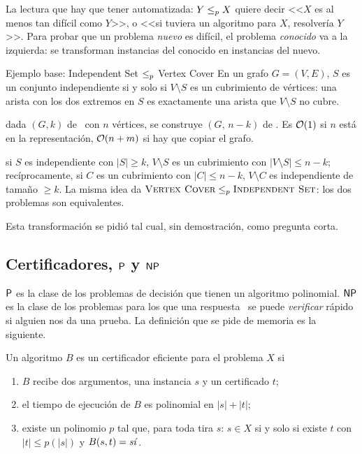 La lectura que hay que tener automatizada: $Y\redp X$ quiere decir <<$X$ es al menos tan difícil como $Y$>>, o <<si tuviera un algoritmo para $X$, resolvería $Y$>>. Para probar que un problema \emph{nuevo} es difícil, el problema \emph{conocido} va a la izquierda: se transforman instancias del conocido en instancias del nuevo.

\begin{problema}{Ejemplo base: Independent Set $\redp$ Vertex Cover}
En un grafo $G=(V,E)$, $S$ es un conjunto independiente si y solo si $V\setminus S$ es un cubrimiento de vértices: una arista con los dos extremos en $S$ es exactamente una arista que $V\setminus S$ no cubre.

 dada $(G,k)$ de \npIS\ con $n$ vértices, se construye $(G,\,n-k)$ de \npVC. Es $\Oh(1)$ si $n$ está en la representación, $\Oh(n+m)$ si hay que copiar el grafo.

 si $S$ es independiente con $|S|\ge k$, $V\setminus S$ es un cubrimiento con $|V\setminus S|\le n-k$; recíprocamente, si $C$ es un cubrimiento con $|C|\le n-k$, $V\setminus C$ es independiente de tamaño $\ge k$. La misma idea da $\npVC\redp\npIS$: los dos problemas son equivalentes.
\end{problema}

Esta transformación se pidió tal cual, sin demostración, como pregunta corta.

\subsection{Certificadores, \texorpdfstring{$\Pclass$}{P} y \texorpdfstring{$\NP$}{NP}}

$\Pclass$ es la clase de los problemas de decisión que tienen un algoritmo polinomial. $\NP$ es la clase de los problemas para los que una respuesta \npsi\ se puede \emph{verificar} rápido si alguien nos da una prueba. La definición que se pide de memoria es la siguiente.

\begin{definicion}
Un algoritmo $B$ es un certificador eficiente para el problema $X$ si
\begin{enumerate}[label=(\arabic*)]
  \item $B$ recibe dos argumentos, una instancia $s$ y un certificado $t$;
  \item el tiempo de ejecución de $B$ es polinomial en $|s|+|t|$;
  \item existe un polinomio $p$ tal que, para toda tira $s$: $s\in X$ si y solo si existe $t$ con $|t|\le p(|s|)$ y $B(s,t)=\text{\npsi}$.
\end{enumerate}
\end{definicion}

